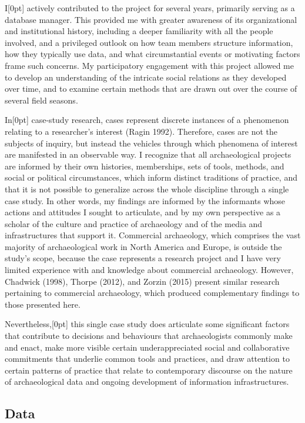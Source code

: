 \documentclass[
]{article}
\newcommand{\paragraphnumber}[1]{\marginnote{\color{lightgray}\tiny{#1}}[0pt]}
\begin{document}
I\paragraphnumber{[13]} actively contributed to the project for several
years, primarily serving as a database manager. This provided me with
greater awareness of its organizational and institutional history,
including a deeper familiarity with all the people involved, and a
privileged outlook on how team members structure information, how they
typically use data, and what circumstantial events or motivating factors
frame such concerns. My participatory engagement with this project
allowed me to develop an understanding of the intricate social relations
as they developed over time, and to examine certain methods that are
drawn out over the course of several field seasons.

In\paragraphnumber{[14]} case-study research, cases represent discrete
instances of a phenomenon relating to a researcher's interest (Ragin
1992). Therefore, cases are not the subjects of inquiry, but instead the
vehicles through which phenomena of interest are manifested in an
observable way. I recognize that all archaeological projects are
informed by their own histories, memberships, sets of tools, methods,
and social or political circumstances, which inform distinct traditions
of practice, and that it is not possible to generalize across the whole
discipline through a single case study. In other words, my findings are
informed by the informants whose actions and attitudes I sought to
articulate, and by my own perspective as a scholar of the culture and
practice of archaeology and of the media and infrastructures that
support it. Commercial archaeology, which comprises the vast majority of
archaeological work in North America and Europe, is outside the study's
scope, because the case represents a research project and I have very
limited experience with and knowledge about commercial archaeology.
However, Chadwick (1998), Thorpe (2012), and Zorzin (2015) present
similar research pertaining to commercial archaeology, which produced
complementary findings to those presented here.

Nevertheless,\paragraphnumber{[15]} this single case study does
articulate some significant factors that contribute to decisions and
behaviours that archaeologists commonly make and enact, make more
visible certain underappreciated social and collaborative commitments
that underlie common tools and practices, and draw attention to certain
patterns of practice that relate to contemporary discourse on the nature
of archaeological data and ongoing development of information
infrastructures.

\subsection{Data}\label{data}
\end{document}
